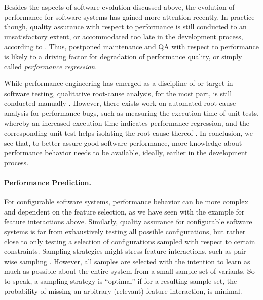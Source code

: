 Besides the aspects of software evolution discussed above, the evolution of
performance for software systems has gained more attention recently. In
practice though, quality assurance with respect to performance is still
conducted to an unsatisfactory extent, or accommodated too late in the
development process, according to \cite{molyneaux_art_2014}. Thus, postponed
maintenance and QA with respect to performance is likely to a driving factor for
degradation of performance quality, or simply called \emph{performance regression}.

While performance engineering has emerged as a discipline of or target
in software testing, qualitative root-cause analysis, for the most part, is
still conducted manually \citep{molyneaux_art_2014}. However, there exists work
on automated root-cause analysis for performance bugs, such as measuring the
execution time of unit tests, whereby an increased execution time indicates performance
regression, and the corresponding unit test helps isolating the root-cause
thereof \citep{heger_automated_2013,nguyen_industrial_2014}. In conclusion, we
see that, to better assure good software performance, more knowledge about performance behavior needs to be
available, ideally, earlier in the development process.

\paragraph{Performance Prediction.}
For configurable software systems, performance behavior can be more complex and
dependent on the feature selection, as we have seen with the example for
feature interactions above. Similarly, quality assurance for configurable
software systems is far from exhaustively testing all possible configurations,
but rather close to only testing a selection of configurations sampled with
respect to certain constraints. Sampling strategies might stress feature
interactions, such as pair-wise sampling \citep{siegmund_predicting_2012}.
However, all samples are selected with the intention to learn as much as
possible about the entire system from a small sample set of variants. So to
speak, a sampling strategy is ``optimal'' if for a resulting sample set, the
probability of missing an arbitrary (relevant) feature interaction, is minimal.

